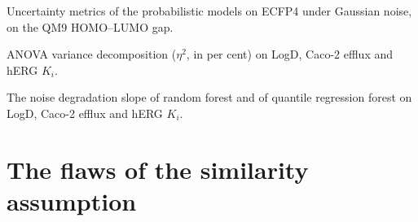 \label{app:noise:sec:uncertainty_metrics_ecfp4}
Uncertainty metrics of the probabilistic models on ECFP4 under Gaussian noise, on the QM9 HOMO--LUMO gap.


\label{app:noise:sec:assay_variance_decomposition}
ANOVA variance decomposition ($\eta^2$, in per cent) on LogD, Caco-2 efflux and hERG $K_i$.


\label{app:noise:sec:rf_vs_qrf_assay}
The noise degradation slope of random forest and of quantile regression forest on LogD, Caco-2 efflux and hERG $K_i$.


\section{The flaws of the similarity assumption}\label{app:add:flaws}

